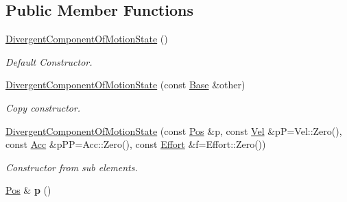 \subsection*{Public Member Functions}
\begin{DoxyCompactItemize}
\item 
\hyperlink{classow__core_1_1DivergentComponentOfMotionState_ac7709a449287ded519658ec2bc625488}{Divergent\+Component\+Of\+Motion\+State} ()\hypertarget{classow__core_1_1DivergentComponentOfMotionState_ac7709a449287ded519658ec2bc625488}{}\label{classow__core_1_1DivergentComponentOfMotionState_ac7709a449287ded519658ec2bc625488}

\begin{DoxyCompactList}\small\item\em Default Constructor. \end{DoxyCompactList}\item 
\hyperlink{classow__core_1_1DivergentComponentOfMotionState_a247a6c466eb18c499b58596c6436db40}{Divergent\+Component\+Of\+Motion\+State} (const \hyperlink{classow__core_1_1LinearStateBase}{Base} \&other)\hypertarget{classow__core_1_1DivergentComponentOfMotionState_a247a6c466eb18c499b58596c6436db40}{}\label{classow__core_1_1DivergentComponentOfMotionState_a247a6c466eb18c499b58596c6436db40}

\begin{DoxyCompactList}\small\item\em Copy constructor. \end{DoxyCompactList}\item 
\hyperlink{classow__core_1_1DivergentComponentOfMotionState_af044ab7c8347c0c59752dc06591ad8b2}{Divergent\+Component\+Of\+Motion\+State} (const \hyperlink{classow__core_1_1DivergentComponentOfMotion}{Pos} \&p, const \hyperlink{classow__core_1_1DivergentComponentOfMotionVelocity}{Vel} \&pP=Vel\+::\+Zero(), const \hyperlink{classow__core_1_1DivergentComponentOfMotionAcceleration}{Acc} \&p\+PP=Acc\+::\+Zero(), const \hyperlink{classow__core_1_1Force}{Effort} \&f=Effort\+::\+Zero())\hypertarget{classow__core_1_1DivergentComponentOfMotionState_af044ab7c8347c0c59752dc06591ad8b2}{}\label{classow__core_1_1DivergentComponentOfMotionState_af044ab7c8347c0c59752dc06591ad8b2}

\begin{DoxyCompactList}\small\item\em Constructor from sub elements. \end{DoxyCompactList}\item 
\hyperlink{classow__core_1_1DivergentComponentOfMotion}{Pos} \& {\bfseries p} ()\hypertarget{classow__core_1_1DivergentComponentOfMotionState_a0f85578292fd3ab6aaa95d6c85cbb3e9}{}\label{classow__core_1_1DivergentComponentOfMotionState_a0f85578292fd3ab6aaa95d6c85cbb3e9}


\end{DoxyCompactItemize}
